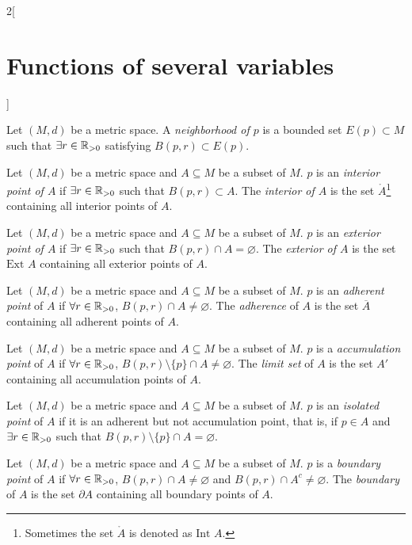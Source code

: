 \documentclass[../../../main.tex]{subfiles}
\begin{document}
\begin{multicols}{2}[\section{Functions of several variables}]
\begin{definition}
        Let $(M,d)$ be a metric space. A \textit{neighborhood of $p$} is a bounded set $E(p)\subset M$ such that $\exists r\in\mathbb{R}_{>0}$ satisfying $B(p,r)\subset E(p)$.
    \end{definition}
    \begin{definition}
        Let $(M,d)$ be a metric space and $A\subseteq M$ be a subset of $M$. $p$ is an \textit{interior point of $A$} if $\exists r\in\mathbb{R}_{>0}$ such that $B(p,r)\subset A$. The \textit{interior of $A$} is the set $\mathring A$\footnote{Sometimes the set $\mathring A$ is denoted as $\text{Int }A$.} containing all interior points of $A$.
    \end{definition}
    \begin{definition}
        Let $(M,d)$ be a metric space and $A\subseteq M$ be a subset of $M$. $p$ is an \textit{exterior point of $A$} if $\exists r\in\mathbb{R}_{>0}$ such that $B(p,r)\cap A=\varnothing$. The \textit{exterior of $A$} is the set $\text{Ext } A$ containing all exterior points of $A$.
    \end{definition}
    \begin{definition}
        Let $(M,d)$ be a metric space and $A\subseteq M$ be a subset of $M$. $p$ is an \textit{adherent point} of $A$ if $\forall r\in\mathbb{R}_{>0}$, $B(p,r)\cap A\ne\varnothing$. The \textit{adherence} of $A$ is the set $\overline{A}$ containing all adherent points of $A$.
    \end{definition}
    \begin{definition}
        Let $(M,d)$ be a metric space and $A\subseteq M$ be a subset of $M$. $p$ is a \textit{accumulation point} of $A$ if $\forall r\in\mathbb{R}_{>0}$, $B(p,r)\setminus\{p\}\cap A\ne\varnothing$. The \textit{limit set} of $A$ is the set $A'$ containing all accumulation points of $A$.
    \end{definition}
    \begin{definition}
        Let $(M,d)$ be a metric space and $A\subseteq M$ be a subset of $M$. $p$ is an \textit{isolated point} of $A$ if it is an adherent but not accumulation point, that is, if $p\in A$ and $\exists r\in\mathbb{R}_{>0}$ such that $B(p,r)\setminus\{p\}\cap A=\varnothing$.
    \end{definition}
    \begin{definition}
        Let $(M,d)$ be a metric space and $A\subseteq M$ be a subset of $M$. $p$ is a \textit{boundary point} of $A$ if $\forall r\in\mathbb{R}_{>0}$, $B(p,r)\cap A\ne\varnothing$ and $B(p,r)\cap A^c\ne\varnothing$. The \textit{boundary} of $A$ is the set $\partial A$ containing all boundary points of $A$.

\end{definition}
\end{multicols}
\end{document}

